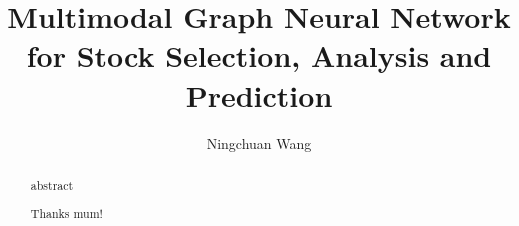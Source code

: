 \documentclass[a4paper, twoside]{report}
\title{Multimodal Graph Neural Network for Stock Selection, Analysis and Prediction}
\author{Ningchuan Wang}
\begin{document}


\begin{abstract}
abstract
\end{abstract}

\renewcommand{\abstractname}{Acknowledgements}
\begin{abstract}
Thanks mum!
\end{abstract}

\tableofcontents
\listoffigures
\listoftables









\end{document}
